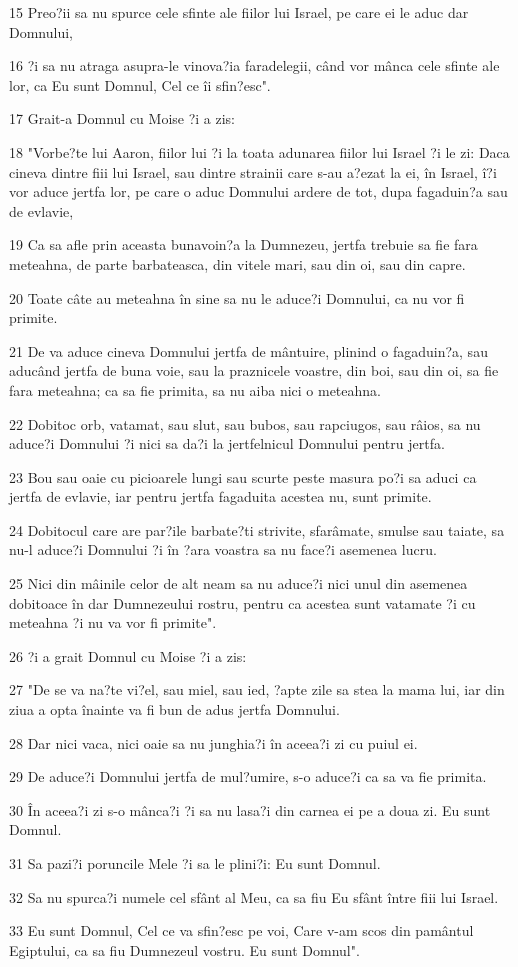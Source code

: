 \par 15 Preo?ii sa nu spurce cele sfinte ale fiilor lui Israel, pe care ei le aduc dar Domnului,
\par 16 ?i sa nu atraga asupra-le vinova?ia faradelegii, când vor mânca cele sfinte ale lor, ca Eu sunt Domnul, Cel ce îi sfin?esc".
\par 17 Grait-a Domnul cu Moise ?i a zis:
\par 18 "Vorbe?te lui Aaron, fiilor lui ?i la toata adunarea fiilor lui Israel ?i le zi: Daca cineva dintre fiii lui Israel, sau dintre strainii care s-au a?ezat la ei, în Israel, î?i vor aduce jertfa lor, pe care o aduc Domnului ardere de tot, dupa fagaduin?a sau de evlavie,
\par 19 Ca sa afle prin aceasta bunavoin?a la Dumnezeu, jertfa trebuie sa fie fara meteahna, de parte barbateasca, din vitele mari, sau din oi, sau din capre.
\par 20 Toate câte au meteahna în sine sa nu le aduce?i Domnului, ca nu vor fi primite.
\par 21 De va aduce cineva Domnului jertfa de mântuire, plinind o fagaduin?a, sau aducând jertfa de buna voie, sau la praznicele voastre, din boi, sau din oi, sa fie fara meteahna; ca sa fie primita, sa nu aiba nici o meteahna.
\par 22 Dobitoc orb, vatamat, sau slut, sau bubos, sau rapciugos, sau râios, sa nu aduce?i Domnului ?i nici sa da?i la jertfelnicul Domnului pentru jertfa.
\par 23 Bou sau oaie cu picioarele lungi sau scurte peste masura po?i sa aduci ca jertfa de evlavie, iar pentru jertfa fagaduita acestea nu, sunt primite.
\par 24 Dobitocul care are par?ile barbate?ti strivite, sfarâmate, smulse sau taiate, sa nu-l aduce?i Domnului ?i în ?ara voastra sa nu face?i asemenea lucru.
\par 25 Nici din mâinile celor de alt neam sa nu aduce?i nici unul din asemenea dobitoace în dar Dumnezeului rostru, pentru ca acestea sunt vatamate ?i cu meteahna ?i nu va vor fi primite".
\par 26 ?i a grait Domnul cu Moise ?i a zis:
\par 27 "De se va na?te vi?el, sau miel, sau ied, ?apte zile sa stea la mama lui, iar din ziua a opta înainte va fi bun de adus jertfa Domnului.
\par 28 Dar nici vaca, nici oaie sa nu junghia?i în aceea?i zi cu puiul ei.
\par 29 De aduce?i Domnului jertfa de mul?umire, s-o aduce?i ca sa va fie primita.
\par 30 În aceea?i zi s-o mânca?i ?i sa nu lasa?i din carnea ei pe a doua zi. Eu sunt Domnul.
\par 31 Sa pazi?i poruncile Mele ?i sa le plini?i: Eu sunt Domnul.
\par 32 Sa nu spurca?i numele cel sfânt al Meu, ca sa fiu Eu sfânt între fiii lui Israel.
\par 33 Eu sunt Domnul, Cel ce va sfin?esc pe voi, Care v-am scos din pamântul Egiptului, ca sa fiu Dumnezeul vostru. Eu sunt Domnul".

